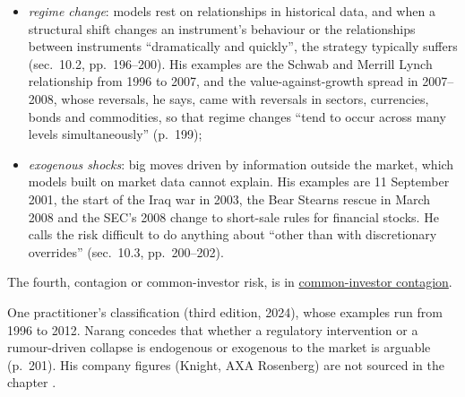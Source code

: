 \begin{qfdefinition}
\begin{itemize}
\begin{itemize}
  \end{itemize}
\item \emph{regime change}: models rest on relationships in historical data, and when a structural shift changes an instrument's behaviour or the relationships between instruments ``dramatically and quickly'', the strategy typically suffers (sec.~10.2, pp.~196--200). His examples are the Schwab and Merrill Lynch relationship from 1996 to 2007, and the value-against-growth spread in 2007--2008, whose reversals, he says, came with reversals in sectors, currencies, bonds and commodities, so that regime changes ``tend to occur across many levels simultaneously'' (p.~199);
\item \emph{exogenous shocks}: big moves driven by information outside the market, which models built on market data cannot explain. His examples are 11 September 2001, the start of the Iraq war in 2003, the Bear Stearns rescue in March 2008 and the SEC's 2008 change to short-sale rules for financial stocks. He calls the risk difficult to do anything about ``other than with discretionary overrides'' (sec.~10.3, pp.~200--202).
\end{itemize}
The fourth, contagion or common-investor risk, is in \hyperref[def:common-investor-contagion]{common-investor contagion}.

 One practitioner's classification (third edition, 2024), whose examples run from 1996 to 2012. Narang concedes that whether a regulatory intervention or a rumour-driven collapse is endogenous or exogenous to the market is arguable (p.~201). His company figures (Knight, AXA Rosenberg) are not sourced in the chapter .


\end{qfdefinition}
